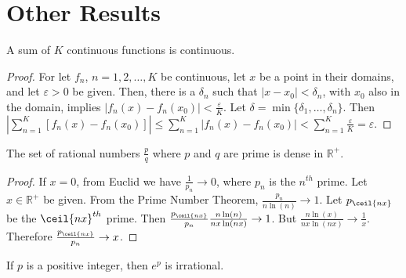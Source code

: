 \documentclass[crop=false,class=book,oneside]{standalone}
\begin{document}
        \section{Other Results}
            \begin{theorem}
                A sum of $K$ continuous functions is continuous. 
            \end{theorem}
            \begin{proof}
                For let $f_n$, $n=1,2,\hdots,K$ be continuous,
                let $x$ be a point in their domains, and let
                $\varepsilon>0$ be given. Then, there is a
                $\delta_n$ such that $|x-x_0|<\delta_n$, with
                $x_0$ also in the domain, implies
                $|f_n(x)-f_n(x_0)|<\frac{\varepsilon}{K}$.
                Let $\delta=\min\{\delta_1,\hdots,\delta_n\}$. Then
                $|\sum_{n=1}^{K}[f_n(x)-f_n(x_0)]|\leq%
                  \sum_{n=1}^{K}|f_n(x)-f_n(x_0)|<%
                  \sum_{n=1}^{K}\frac{\varepsilon}{K}=\varepsilon$.
            \end{proof}
            \begin{theorem}
                The set of rational numbers $\frac{p}{q}$ where $p$
                and $q$ are prime is dense in $\mathbb{R}^{+}$.
            \end{theorem}
            \begin{proof}
                If $x=0$, from Euclid we have
                $\frac{1}{p_n}\rightarrow 0$,
                where $p_n$ is the $n^{th}$ prime. Let
                $x\in\mathbb{R}^{+}$ be given. From the Prime Number
                Theorem, $\frac{p_n}{n\ln(n)}\rightarrow 1$. Let
                $p_{\ceil{nx}}$ be the $\ceil{nx}^{th}$ prime. Then
                $\frac{p_{\ceil{nx}}}{p_n}\frac{n\ln(n)}{nx\ln(nx)}
                \rightarrow 1$. But
                $\frac{n\ln(x)}{nx\ln(nx)}\rightarrow \frac{1}{x}$.
                Therefore $\frac{p_{\ceil{nx}}}{p_n}\rightarrow x$.
            \end{proof}
            \begin{theorem}
                If $p$ is a positive integer, then
                $e^{p}$ is irrational.
            \end{theorem}
\end{document}
